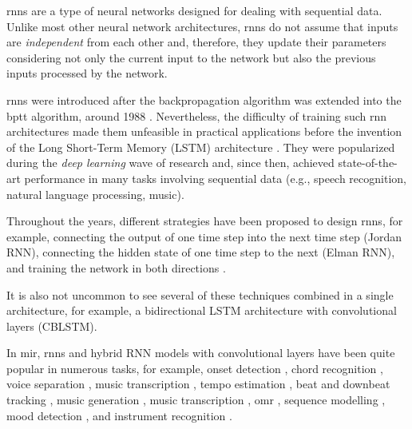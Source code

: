 

\glspl{rnn} are a type of neural networks designed for
dealing with sequential data. Unlike most other neural
network architectures, \glspl{rnn} do not assume that inputs
are \emph{independent} from each other and, therefore, they
update their parameters considering not only the current
input to the network but also the previous inputs processed
by the network.

\glspl{rnn} were introduced after the backpropagation
algorithm \parencite{rumelhart1988learning} was extended
into the \gls{bptt} algorithm, around 1988
\parencite{werbos1988generalization,
werbos1990backpropagation}. Nevertheless, the difficulty of
training such \gls{rnn} architectures made them unfeasible
in practical applications before the invention of the Long
Short-Term Memory (LSTM) architecture
\parencite{hochreiter1997long}. They were popularized during
the \emph{deep learning} wave of research and, since then,
achieved state-of-the-art performance in many tasks
involving sequential data (e.g., speech recognition, natural
language processing, music).

Throughout the years, different strategies have been
proposed to design \glspl{rnn}, for example, connecting the
output of one time step into the next time step (Jordan
RNN), connecting the hidden state of one time step to the
next (Elman RNN), and training the network in both
directions \parencite{schuster1997bidirectional}.

It is also not uncommon to see several of these techniques
combined in a single architecture, for example, a
bidirectional LSTM architecture with convolutional layers
(CBLSTM).

In \gls{mir}, \glspl{rnn} and hybrid RNN models with
convolutional layers have been quite popular in numerous
tasks, for example, onset detection
\parencite{eyben2010universal}, chord recognition
\parencite{boulangerlewandowski2013audio, sigtia2016endend,
sears2018evaluating}, voice separation
\parencite{huang2014singingvoice}, music transcription
\parencite{sigtia2014rnnbased}, tempo estimation
\parencite{bock2015accurate}, beat and downbeat tracking
\parencite{bock2016joint, krebs2016downbeat}, music
generation \parencite{liu2016predicting, liang2017automatic,
lim2017chord}, music transcription
\parencite{rigaud2016singing, sigtia2016endend,
southall2016automatic, vogl2016recurrent,
southall2017automatic, vogl2017drum, basaran2018main},
\gls{omr} \parencite{calvozaragoza2017onestep,
wel2017optical, calvozaragoza2018cameraprimus}, sequence
modelling \parencite{ycart2017study}, mood detection
\parencite{delbouys2018music}, and instrument recognition
\parencite{gururani2018instrument}.



